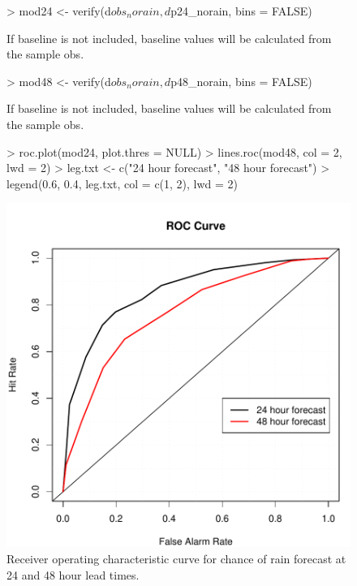 \documentclass{article}
\begin{document}
\begin {center}
\begin{figure}[H]
\begin{Schunk}
\begin{Sinput}
> mod24 <- verify(d$obs_norain, d$p24_norain, bins = FALSE)
\end{Sinput}
\begin{Soutput}
If baseline is not included, baseline values  will be calculated from the  sample obs. 
\end{Soutput}
\begin{Sinput}
> mod48 <- verify(d$obs_norain, d$p48_norain, bins = FALSE)
\end{Sinput}
\begin{Soutput}
If baseline is not included, baseline values  will be calculated from the  sample obs. 
\end{Soutput}
\begin{Sinput}
> roc.plot(mod24, plot.thres = NULL)
> lines.roc(mod48, col = 2, lwd = 2)
> leg.txt <- c("24 hour forecast", "48 hour forecast")
> legend(0.6, 0.4, leg.txt, col = c(1, 2), lwd = 2)
\end{Sinput}
\end{Schunk}
\includegraphics{verification-005}
\caption{\label{roc1} Receiver operating characteristic curve for chance of 
rain forecast at 24 and 48 hour lead times.}
\end{figure}
\end{center}    
\end{document}
